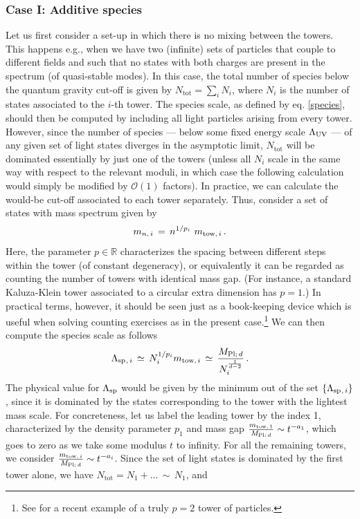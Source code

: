 \subsubsection*{Case I: Additive species}

 Let us first consider a set-up in which there is no mixing between the towers. This happens e.g., when we have two (infinite) sets of particles that couple to different fields and such that no states with both charges are present in the spectrum (of quasi-stable modes). In this case, the total number of species below the quantum gravity cut-off is given by $N_{\mathrm{tot}}= \sum_i N_i$, where $N_i$ is the number of states associated to the $i$-th tower. The species scale, as defined by eq. \eqref{species}, should then be computed by including all light particles arising from every tower. However, since the number of species --- below some fixed energy scale $\Lambda_{\rm UV}$ --- of any given set of light states diverges in the asymptotic limit, $N_{\mathrm{tot}}$ will be dominated essentially by just one of the towers (unless all $N_i$ scale in the same way with respect to the relevant moduli, in which case the following calculation would simply be modified by $\mathcal{O}(1)$ factors). In practice, we can calculate the would-be cut-off associated to each tower separately. Thus, consider a set of states with mass spectrum given by
%
\begin{equation}
\label{eq:Mni}
		m_{n,\, i}\, =\, n^{1/p_i}\ m_{\text{tow,}\, i}\, .
\end{equation}
%
Here, the parameter $p \in \mathbb{R}$ characterizes the spacing between different steps within the tower (of constant degeneracy), or equivalently it can be regarded as counting the number of towers with identical mass gap. (For instance, a standard Kaluza-Klein tower associated to a circular extra dimension has $p=1$.) In practical terms, however, it should be seen just as a book-keeping device which is useful when solving counting exercises as in the present case.\footnote{See \cite{Casas:2024ttx} for a recent example of a truly $p=2$ tower of particles.} We can then compute the species scale as follows
%
\begin{equation}\label{eq:speciesscaleithtower}
		\Lambda_{\text{sp}}{}_{,\, i}\, \simeq\, N_i^{1/p_i}m_{\text{tow,}\, i}\, \simeq\, \dfrac{M_{\text{Pl;}\, d}}{N_i^{\frac{1}{d-2}}}\, .
\end{equation}
%
The physical value for $\Lambda_{\text{sp}}$ would be given by the minimum out of the set $\{ \Lambda_{\text{sp}}{}_{,\, i} \}$, since it is dominated by the states corresponding to the tower with the lightest mass scale. For concreteness, let us label the leading tower by the index 1, characterized by the density parameter $p_1$ and mass gap $\frac{m_{\text{tow,}\, 1}}{M_{\text{Pl;}\, d}} \sim t^{-a_1}$, which goes to zero as we take some modulus $t$ to infinity. For all the remaining towers, we consider $\frac{m_{\text{tow,}\, i}}{M_{\text{Pl;}\, d}} \sim t^{-a_i}$. Since the set of light states is dominated by the first tower alone, we have $N_{\text{tot}}=N_1+\ldots\, \sim\, N_1$, and
